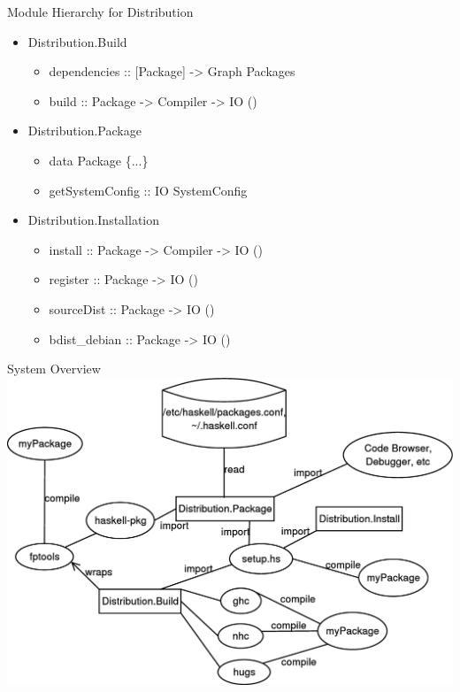 \documentclass[pdf,rico,slideColor,colorBG]{prosper}
\begin{document}
\begin{slide}{Module Hierarchy for Distribution}
  \begin{itemize}
   \item Distribution.Build
     \begin{itemize}
       \item dependencies :: [Package] -> Graph Packages
       \item build        :: Package -> Compiler -> IO ()
     \end{itemize}
   \item Distribution.Package
     \begin{itemize}
       \item data Package \{...\}
       \item getSystemConfig :: IO SystemConfig
     \end{itemize}
   \item Distribution.Installation
     \begin{itemize}
       \item install :: Package -> Compiler -> IO ()
       \item register :: Package -> IO ()
       \item sourceDist :: Package -> IO ()
       \item bdist\_debian :: Package -> IO ()
     \end{itemize}
  \end{itemize}
\end{slide}

\begin{slide}{System Overview}
   \includegraphics[width=.9\textwidth]{WholeSystem.eps}
\end{slide}
\end{document}
